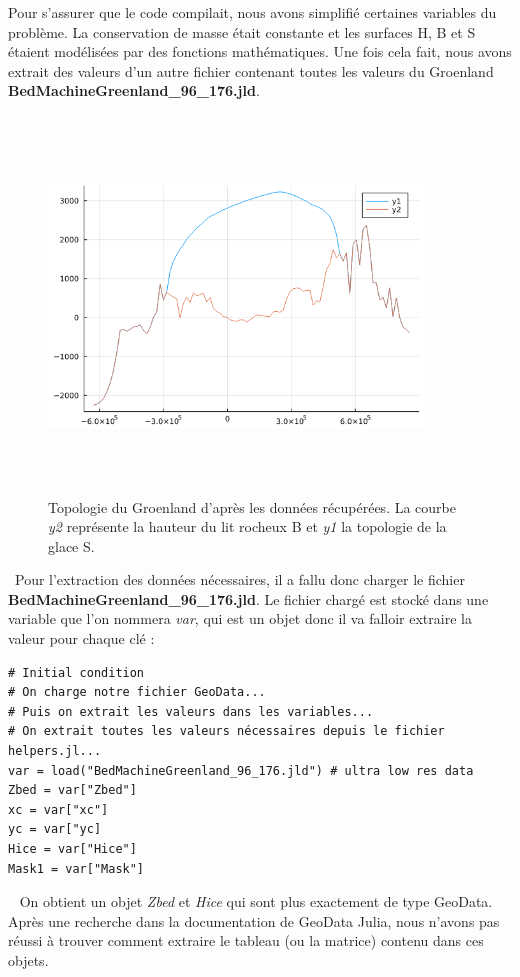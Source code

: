 \documentclass{article}
\begin{document}
Pour s'assurer que le code compilait, nous avons simplifié certaines variables du problème. La conservation de masse était constante et les surfaces H, B et S  étaient modélisées par des fonctions mathématiques. Une fois cela fait, nous avons extrait des valeurs d'un autre fichier contenant toutes les valeurs du Groenland \textbf{BedMachineGreenland\_96\_176.jld}.
\begin{figure}[!htpb]
\centering
\includegraphics[width=10cm, keepaspectratio=true, height=10cm]{Groenland.png}
\caption{Topologie du Groenland d'après les données récupérées. La courbe \textit{y2} représente la hauteur du lit rocheux B et \textit{y1} la topologie de la glace S. }
\end{figure}

\
Pour l’extraction des données nécessaires, il a fallu donc charger le ﬁchier \textbf{BedMachineGreenland\_96\_176.jld}.
Le ﬁchier chargé est stocké dans une variable que l’on nommera \textit{var}, qui est un objet donc il va falloir extraire la valeur pour chaque clé : 

\begin{verbatim}
# Initial condition
# On charge notre fichier GeoData...
# Puis on extrait les valeurs dans les variables...
# On extrait toutes les valeurs nécessaires depuis le fichier helpers.jl...
var = load("BedMachineGreenland_96_176.jld") # ultra low res data 
Zbed = var["Zbed"]
xc = var["xc"]
yc = var["yc]
Hice = var["Hice"]
Mask1 = var["Mask"]
\end{verbatim}
\
\newpage
On obtient un objet \textit{Zbed} et \textit{Hice} qui sont plus exactement de type GeoData. Après une recherche dans la documentation de GeoData Julia, nous n’avons pas réussi à trouver comment extraire le tableau (ou la matrice) contenu dans ces objets.
\end{document}
